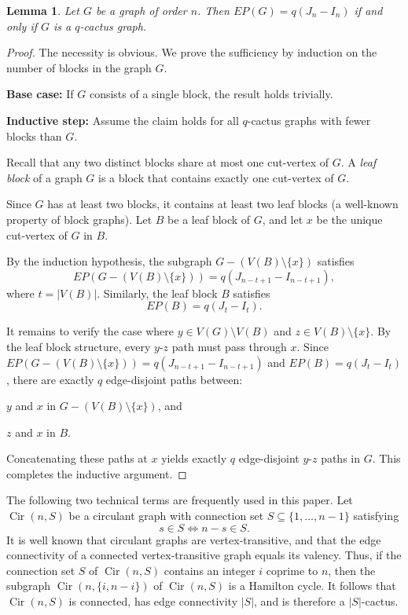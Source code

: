 \documentclass{article}
\newtheorem{lemma}[theorem]{Lemma}
\begin{document}
\begin{lemma}\label{ML-0}
Let $G$ be a graph of order $n$. Then $EP(G) = q(J_n-I_n)$ if and only if
$G$ is a $q$-cactus graph.
\end{lemma}
\begin{proof}
The necessity is obvious. We prove the sufficiency by induction on the number of blocks in the graph \( G \).  

{\bf Base case:} If \( G \) consists of a single block, the result holds trivially.  

{\bf Inductive step:} Assume the claim holds for all \( q \)-cactus graphs with fewer blocks than \( G \). 

Recall that any two distinct blocks share at most one cut-vertex of $G$. A {\it leaf block} of a graph \( G \) is a block that contains exactly one cut-vertex of $G$.

Since \( G \) has at least two blocks, it contains at least two leaf blocks (a well-known property of block graphs). Let \( B \) be a leaf block of \( G \), and let \( x \) be the unique cut-vertex of \( G \) in \( B \).  

By the induction hypothesis, the subgraph \( G - (V(B) \setminus \{x\}) \) satisfies  
\[  
EP(G - (V(B) \setminus \{x\})) = q(J_{n-t+1} - I_{n-t+1}),  
\]  
where \( t = |V(B)| \). Similarly, the leaf block \( B \) satisfies  
\[  
EP(B) = q(J_t - I_t).  
\]  

It remains to verify the case where \( y \in V(G) \setminus V(B) \) and \( z \in V(B) \setminus \{x\} \). By the leaf block structure, every \( y \)-\( z \) path must pass through \( x \). Since $EP(G - (V(B) \setminus \{x\})) = q(J_{n-t+1} - I_{n-t+1})$ and $EP(B) = q(J_t - I_t)$, there are exactly \( q \) edge-disjoint paths between:  

 \( y \) and \( x \) in \( G - (V(B) \setminus \{x\}) \), and  

\( z \) and \( x \) in \( B \).  

Concatenating these paths at \( x \) yields exactly \( q \) edge-disjoint \( y \)-\( z \) paths in \( G \). This completes the inductive argument.  

\end{proof}

The following two technical terms are frequently used in this paper. Let \(\operatorname{Cir}(n, S)\) be a circulant graph with connection set \(S\subseteq\{1,\dots,n-1\}\) satisfying
\[
s\in S \iff n-s\in S. 
\]
It is well known that circulant graphs are vertex-transitive, and that the edge connectivity of a connected vertex-transitive graph equals its valency. Thus, if the connection set \(S\) of \(\operatorname{Cir}(n,S)\) contains an integer \(i\) coprime to \(n\), then the subgraph \(\operatorname{Cir}(n,\{i,n-i\})\) of \(\operatorname{Cir}(n,S)\) is a Hamilton cycle. It follows that \(\operatorname{Cir}(n,S)\) is connected, has edge connectivity \(|S|\), and is therefore a \(|S|\)-cactus.
\end{document}
